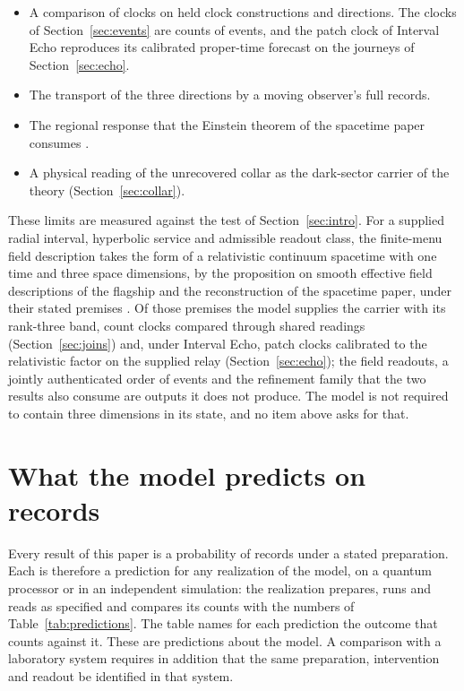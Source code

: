 \documentclass[11pt]{article}
\theoremstyle{definition}
\theoremstyle{remark}
\theoremstyle{plain}
\begin{document}
\begin{itemize}[leftmargin=1.6em,itemsep=1pt]
of admissible observer records between levels; agreement of state encodings
is no part of it.
\item A comparison of clocks on held clock constructions and directions.
The clocks of Section~\ref{sec:events} are counts of events, and the patch clock of Interval Echo reproduces its calibrated proper-time forecast on the
journeys of Section~\ref{sec:echo}.
\item The transport of the three directions by a moving observer's full
records.
\item The regional response that the Einstein theorem of the spacetime
paper consumes \cite{ophspacetime}.
\item A physical reading of the unrecovered collar as the dark-sector
carrier of the theory (Section~\ref{sec:collar}).
\end{itemize}

These limits are measured against the test of Section~\ref{sec:intro}.
For a supplied radial interval, hyperbolic service and admissible readout class, the finite-menu field description takes the form of a relativistic continuum spacetime with one time and three space dimensions,
by the proposition on smooth effective field descriptions of the flagship
and the reconstruction of the spacetime paper, under their stated premises
\cite{flagship,ophspacetime}. Of those premises the model supplies the
carrier with its rank-three band, count clocks compared through shared
readings (Section~\ref{sec:joins}) and, under Interval Echo, patch clocks calibrated to the relativistic factor on the supplied relay
(Section~\ref{sec:echo}); the field readouts, a jointly authenticated order
of events and the refinement family that the two results also consume are
outputs it does not produce. The model is not required to contain three
dimensions in its state, and no item above asks for that.


\section{What the model predicts on records}
\label{sec:predictions}

Every result of this paper is a probability of records under a stated
preparation. Each is therefore a prediction for any realization of the
model, on a quantum processor or in an independent simulation: the
realization prepares, runs and reads as specified and compares its counts
with the numbers of Table~\ref{tab:predictions}. The table names for each
prediction the outcome that counts against it. These are predictions about
the model. A comparison with a laboratory system requires in addition that
the same preparation, intervention and readout be identified in that
system.
\end{document}
